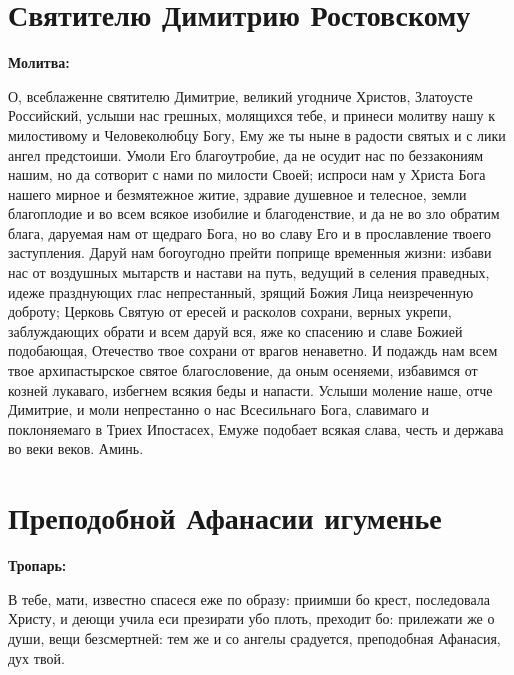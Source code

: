 
 

\section{Святителю Димитрию Ростовскому}
 


\bfseries Молитва:\normalfont{}


О, всеблаженне святителю Димитрие, великий угодниче Христов, Златоусте Российский, услыши нас грешных, молящихся тебе, и принеси молитву нашу к милостивому и Человеколюбцу Богу, Ему же ты ныне в радости святых и с лики ангел предстоиши. Умоли Его благоутробие, да не осудит нас по беззакониям нашим, но да сотворит с нами по милости Своей; испроси нам у Христа Бога нашего мирное и безмятежное житие, здравие душевное и телесное, земли благоплодие и во всем всякое изобилие и благоденствие, и да не во зло обратим блага, даруемая нам от щедраго Бога, но во славу Его и в прославление твоего заступления. Даруй нам богоугодно прейти поприще временныя жизни: избави нас от воздушных мытарств и настави на путь, ведущий в селения праведных, идеже празднующих глас непрестанный, зрящий Божия Лица неизреченную доброту; Церковь Святую от ересей и расколов сохрани, верных укрепи, заблуждающих обрати и всем даруй вся, яже ко спасению и славе Божией подобающая, Отечество твое сохрани от врагов ненаветно. И подаждь нам всем твое архипастырское святое благословение, да оным осеняеми, избавимся от козней лукаваго, избегнем всякия беды и напасти. Услыши моление наше, отче Димитрие, и моли непрестанно о нас Всесильнаго Бога, славимаго и поклоняемаго в Триех Ипостасех, Емуже подобает всякая слава, честь и держава во веки веков. Аминь.



 

\section{Преподобной Афанасии игуменье}
 


\bfseries Тропарь:\normalfont{}

 В тебе, мати, известно спасеся еже по образу: приимши бо крест, последовала Христу, и деющи учила еси презирати убо плоть, преходит бо: прилежати же о души, вещи безсмертней: тем же и со ангелы срадуется, преподобная Афанасия, дух твой.


